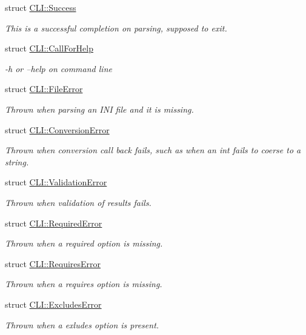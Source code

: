 \begin{DoxyCompactItemize}
struct \hyperlink{struct_c_l_i_1_1_success}{C\+L\+I\+::\+Success}
\begin{DoxyCompactList}\small\item\em This is a successful completion on parsing, supposed to exit. \end{DoxyCompactList}\item 
struct \hyperlink{struct_c_l_i_1_1_call_for_help}{C\+L\+I\+::\+Call\+For\+Help}
\begin{DoxyCompactList}\small\item\em -\/h or --help on command line \end{DoxyCompactList}\item 
struct \hyperlink{struct_c_l_i_1_1_file_error}{C\+L\+I\+::\+File\+Error}
\begin{DoxyCompactList}\small\item\em Thrown when parsing an I\+NI file and it is missing. \end{DoxyCompactList}\item 
struct \hyperlink{struct_c_l_i_1_1_conversion_error}{C\+L\+I\+::\+Conversion\+Error}
\begin{DoxyCompactList}\small\item\em Thrown when conversion call back fails, such as when an int fails to coerse to a string. \end{DoxyCompactList}\item 
struct \hyperlink{struct_c_l_i_1_1_validation_error}{C\+L\+I\+::\+Validation\+Error}
\begin{DoxyCompactList}\small\item\em Thrown when validation of results fails. \end{DoxyCompactList}\item 
struct \hyperlink{struct_c_l_i_1_1_required_error}{C\+L\+I\+::\+Required\+Error}
\begin{DoxyCompactList}\small\item\em Thrown when a required option is missing. \end{DoxyCompactList}\item 
struct \hyperlink{struct_c_l_i_1_1_requires_error}{C\+L\+I\+::\+Requires\+Error}
\begin{DoxyCompactList}\small\item\em Thrown when a requires option is missing. \end{DoxyCompactList}\item 
struct \hyperlink{struct_c_l_i_1_1_excludes_error}{C\+L\+I\+::\+Excludes\+Error}
\begin{DoxyCompactList}\small\item\em Thrown when a exludes option is present. \end{DoxyCompactList}\item 

\end{DoxyCompactItemize}

